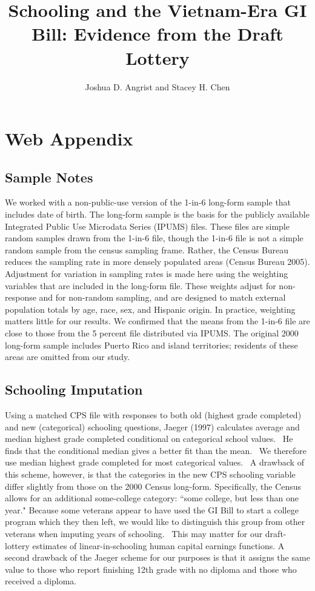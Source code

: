 \documentclass[12pt]{article}
\begin{document}
\title{Schooling and the Vietnam-Era GI Bill: Evidence from the Draft Lottery%
}
\author{Joshua D. Angrist and Stacey H. Chen}
\maketitle

\section*{Web Appendix}

\subsection{Sample Notes}

We worked with a non-public-use version of the 1-in-6 long-form sample that
includes date of birth. The long-form sample is the basis for the publicly
available Integrated Public Use Microdata Series (IPUMS) files. These files
are simple random samples drawn from the 1-in-6 file, though the 1-in-6 file
is not a simple random sample from the census sampling frame. Rather, the
Census Bureau reduces the sampling rate in more densely populated areas
(Census Bureau 2005). Adjustment for variation in sampling rates is made
here using the weighting variables that are included in the long-form file.
These weights adjust for non-response and for non-random sampling, and are
designed to match external population totals by age, race, sex, and Hispanic
origin. In practice, weighting matters little for our results. We confirmed
that the means from the 1-in-6 file are close to those from the 5 percent
file distributed via IPUMS. The original 2000 long-form sample includes
Puerto Rico and island territories; residents of these areas are omitted
from our study.

\subsection{Schooling Imputation}

Using a matched CPS file with responses to both old (highest grade
completed) and new (categorical) schooling questions, Jaeger (1997)
calculates average and median highest grade completed conditional on
categorical school values. \ He finds that the conditional median gives a
better fit than the mean. \ We therefore use median highest grade completed
for most categorical values. \ A drawback of this scheme, however, is that
the categories in the new CPS schooling variable differ slightly from those
on the 2000 Census long-form. Specifically, the Census allows for an
additional some-college category: ``some college, but less than one year."
Because some veterans appear to have used the GI Bill to start a college
program which they then left, we would like to distinguish this group from
other veterans when imputing years of schooling. \ This may matter for our
draft-lottery estimates of linear-in-schooling human capital earnings
functions. A second drawback of the Jaeger scheme for our purposes is that
it assigns the same value to those who report finishing 12th grade with no
diploma and those who received a diploma.
\end{document}
